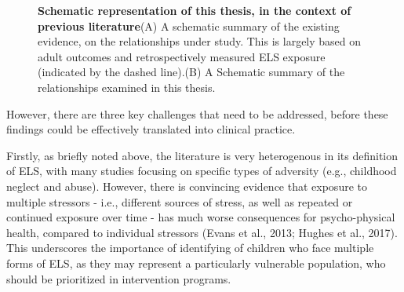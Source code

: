 \documentclass[
  letterpaper,
  DIV=11,
  numbers=noendperiod]{scrreport}
\begin{document}
\begin{figure}[H]


\caption{\label{fig-thesis-summary}\textbf{Schematic representation of
this thesis, in the context of previous literature}\newline(A) A
schematic summary of the existing evidence, on the relationships under
study. This is largely based on adult outcomes and retrospectively
measured ELS exposure (indicated by the dashed line).\newline(B) A
Schematic summary of the relationships examined in this thesis.}

\end{figure}%

However, there are three key challenges that need to be addressed,
before these findings could be effectively translated into clinical
practice.

Firstly, as briefly noted above, the literature is very heterogenous in
its definition of ELS, with many studies focusing on specific types of
adversity (e.g., childhood neglect and abuse). However, there is
convincing evidence that exposure to multiple stressors - i.e.,
different sources of stress, as well as repeated or continued exposure
over time - has much worse consequences for psycho-physical health,
compared to individual stressors (Evans et al., 2013; Hughes et al.,
2017). This underscores the importance of identifying of children who
face multiple forms of ELS, as they may represent a particularly
vulnerable population, who should be prioritized in intervention
programs.
\end{document}
